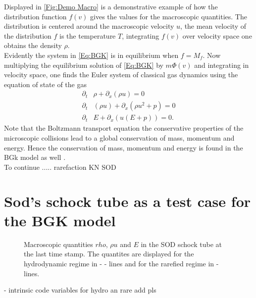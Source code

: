 Displayed in \cref{Fig:Demo Macro} is a demonstrative example of how the distribution function \(f(v)\) gives the values for the macroscopic quantities. The distribution is centered around the macroscopic velocity \(u\), the mean velocity of the distribution \(f\) is the temperature \(T\), integrating \(f(v)\) over velocity space one obtains the density \(\rho\).\\
Evidently the system in \cref{Eq:BGK} is in equilibrium when \(f = M_f\). Now multiplying the equilibrium solution of \cref{Eq:BGK} by \(m\Phi(v)\) and integrating in velocity space, one finds the Euler system of classical gas dynamics using the equation of state of the gas \cite{puppo2019kinetic}
\begin{align}
	\partial_t&\rho + \partial_x(\rho u) = 0
	\\
	\partial_t&(\rho u) + \partial_x(\rho u^2 + p) = 0
	\\
	\partial_t&E + \partial_x(u(E+p)) = 0 \textrm{.}
\end{align} 
Note that the Boltzmann transport equation the conservative properties of the microscopic collisions lead to a global conservation of mass, momentum and energy. Hence the conservation of mass, momentum and energy is found in the BGk model as well \cite{puppo2019kinetic}.\\
To continue .....
rarefaction KN
SOD
\section{Sod's schock tube as a test case for the BGK model} \label{FeaturesSOD}
\begin{figure}
	
\end{figure}
\begin{figure}[!htbp]
	
	\caption{Macroscopic quantities \(rho\), \(\rho u\) and \(E\) in the SOD schock tube at the last time stamp. The quantites are displayed for the hydrodynamic regime in - - lines and for the rarefied regime in - lines.}
\end{figure}
- intrinsic code variables for hydro an rare add pls